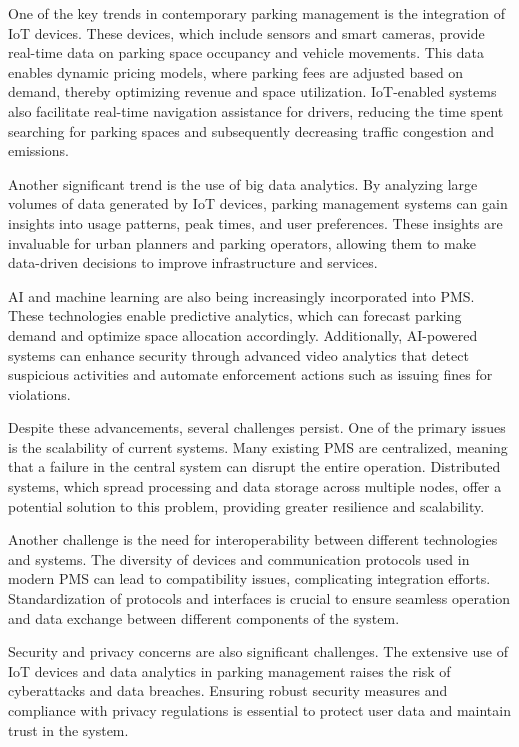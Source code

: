 \documentclass[oneside, 12pt, a4paper, draft]{book}
\begin{document}
One of the key trends in contemporary parking management is the integration of IoT devices. These devices, which include sensors and smart cameras, provide real-time data on parking space occupancy and vehicle movements. This data enables dynamic pricing models, where parking fees are adjusted based on demand, thereby optimizing revenue and space utilization. IoT-enabled systems also facilitate real-time navigation assistance for drivers, reducing the time spent searching for parking spaces and subsequently decreasing traffic congestion and emissions.

Another significant trend is the use of big data analytics. By analyzing large volumes of data generated by IoT devices, parking management systems can gain insights into usage patterns, peak times, and user preferences. These insights are invaluable for urban planners and parking operators, allowing them to make data-driven decisions to improve infrastructure and services.

AI and machine learning are also being increasingly incorporated into PMS. These technologies enable predictive analytics, which can forecast parking demand and optimize space allocation accordingly. Additionally, AI-powered systems can enhance security through advanced video analytics that detect suspicious activities and automate enforcement actions such as issuing fines for violations.

Despite these advancements, several challenges persist. One of the primary issues is the scalability of current systems. Many existing PMS are centralized, meaning that a failure in the central system can disrupt the entire operation. Distributed systems, which spread processing and data storage across multiple nodes, offer a potential solution to this problem, providing greater resilience and scalability.

Another challenge is the need for interoperability between different technologies and systems. The diversity of devices and communication protocols used in modern PMS can lead to compatibility issues, complicating integration efforts. Standardization of protocols and interfaces is crucial to ensure seamless operation and data exchange between different components of the system.

Security and privacy concerns are also significant challenges. The extensive use of IoT devices and data analytics in parking management raises the risk of cyberattacks and data breaches. Ensuring robust security measures and compliance with privacy regulations is essential to protect user data and maintain trust in the system.
\end{document}

